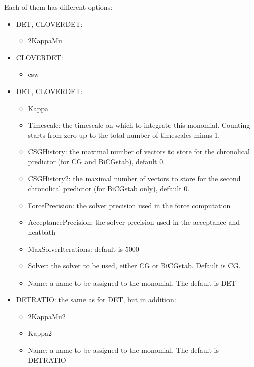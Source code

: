 Each of them has different options:
\begin{itemize}
\item {\ttfamily DET, CLOVERDET}:
  \begin{itemize}
  \item {\ttfamily 2KappaMu}
  \end{itemize}
\item {\ttfamily CLOVERDET}:
  \begin{itemize}
  \item {\ttfamily csw}
  \end{itemize}
\item {\ttfamily DET, CLOVERDET}:
  \begin{itemize}
  \item {\ttfamily Kappa}
  \item {\ttfamily Timescale}: the timescale on which to integrate
    this monomial. Counting starts from zero up to the total number of
    timescales minus 1.
  \item {\ttfamily CSGHistory}: the maximal number of vectors to store
    for the chronolical predictor (for CG and BiCGstab), default $0$.
  \item {\ttfamily CSGHistory2}: the maximal number of vectors to store
    for the second chronolical predictor (for BiCGstab only), default
    $0$.
  \item {\ttfamily ForcePrecision}: the solver precision used in the
    force computation
  \item {\ttfamily AcceptancePrecision}: the solver precision used in the
    acceptance and heatbath
  \item {\ttfamily MaxSolverIterations}: default is $5000$
  \item {\ttfamily Solver}: the solver to be used, either CG or
    BiCGstab. Default is CG.
  \item {\ttfamily Name}: a name to be assigned to the monomial. The
    default is {\ttfamily DET}
  \end{itemize}
\item {\ttfamily DETRATIO}: the same as for {\ttfamily DET}, but in
  addition:
  \begin{itemize}
  \item {\ttfamily 2KappaMu2}
  \item {\ttfamily Kappa2}
  \item {\ttfamily Name}: a name to be assigned to the monomial. The
    default is {\ttfamily DETRATIO}
  \end{itemize}



\end{itemize}
